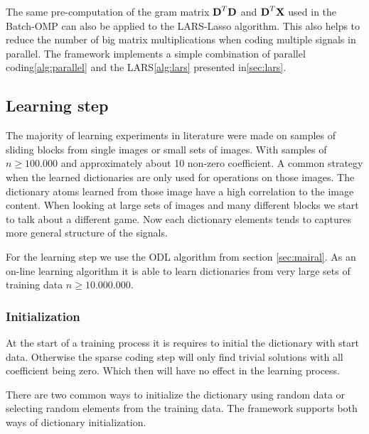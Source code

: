 The same pre-computation of the gram matrix $\boldsymbol{\mathrm{D}}^T\boldsymbol{\mathrm{D}}$ and
$\boldsymbol{\mathrm{D}}^T\boldsymbol{\mathrm{X}}$ used in the Batch-OMP can also be applied to the LARS-Lasso
algorithm. This also helps to reduce the number of big matrix multiplications
when coding multiple signals in parallel. The framework implements a simple
combination of parallel coding\ref{alg:parallel} and the LARS\ref{alg:lars}
presented in\ref{sec:lars}.

\subsection{Learning step}
The majority of learning experiments in literature were made on
samples of sliding blocks from single images or small sets of images.
With samples of $n \ge 100.000$ and approximately about 10 non-zero coefficient.
A common strategy when the learned dictionaries are only used for operations on
those images. The dictionary atoms learned from those image have a high
correlation to the image content.  When looking at large sets of images and many
different blocks we start to talk about a different game. Now each dictionary
elements tends to captures more general structure of the signals.

For the learning step we use the ODL algorithm from section \ref{sec:mairal}. As
an on-line learning algorithm it is able to learn dictionaries from very large
sets of training data $n\ge 10.000.000$.



\subsubsection{Initialization}
At the start of a training process it is requires to initial the
dictionary with start data. Otherwise the sparse coding step will only find
trivial solutions with all coefficient being zero. Which then will have no
effect in the learning process.

There are two common ways to initialize the dictionary using random data or
selecting random elements from the training data. The framework supports 
both ways of dictionary initialization. 


